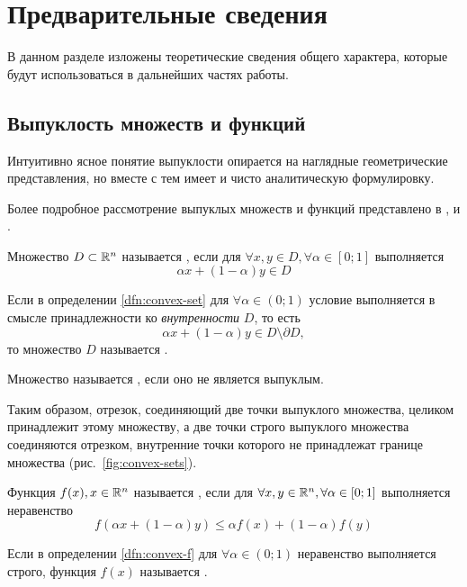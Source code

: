\section{Предварительные сведения}
В данном разделе изложены теоретические сведения общего характера,
которые будут использоваться в дальнейших частях работы.

\subsection{Выпуклость множеств и функций}
\label{sec:convexity}
Интуитивно ясное понятие выпуклости опирается на наглядные
геометрические представления, но вместе с тем имеет и чисто
аналитическую формулировку.

Более подробное рассмотрение выпуклых множеств и функций представлено
в \cite{polovinkin04}, \cite{kolmogorov72} и \cite{fikhtengolz03}.

\begin{dfn}
  \label{dfn:convex-set}
  Множество $D \subset \mathbb{R}^n$ называется , если
  для $\forall x, y \in D, \forall \alpha \in [0;1]$ выполняется
  \begin{equation*}
    \alpha x + (1-\alpha) y \in D
  \end{equation*}
\end{dfn}
\begin{dfn}
  Если в определении \ref{dfn:convex-set} для $\forall \alpha \in
  (0;1)$ условие выполняется в смысле принадлежности ко
  \emph{внутренности} $D$, то есть
  \begin{equation*}
    \alpha x + (1-\alpha) y \in D \setminus \partial D,
  \end{equation*}
  то множество $D$ называется .
\end{dfn}
\begin{dfn}
  Множество называется , если оно не является
  выпуклым.
\end{dfn}
Таким образом, отрезок, соединяющий две точки выпуклого множества,
целиком принадлежит этому множеству, а две точки строго выпуклого
множества соединяются отрезком, внутренние точки которого не
принадлежат границе множества (рис. \ref{fig:convex-sets}).



\begin{dfn}
  \label{dfn:convex-f}
  Функция $f(x), x \in \mathbb{R}^n$ называется , если
  для $\forall x, y \in \mathbb{R}^n, \forall \alpha \in [0;1]$
  выполняется неравенство
  \begin{equation*}
    f(\alpha x + (1-\alpha)y) \leq \alpha f(x) + (1-\alpha) f(y)
  \end{equation*}
\end{dfn}
\begin{dfn}
  \label{dfn:strictly-convex-f}
  Если в определении \ref{dfn:convex-f} для $\forall \alpha \in (0;1)$
  неравенство выполняется строго, функция $f(x)$ называется
  .
\end{dfn}

